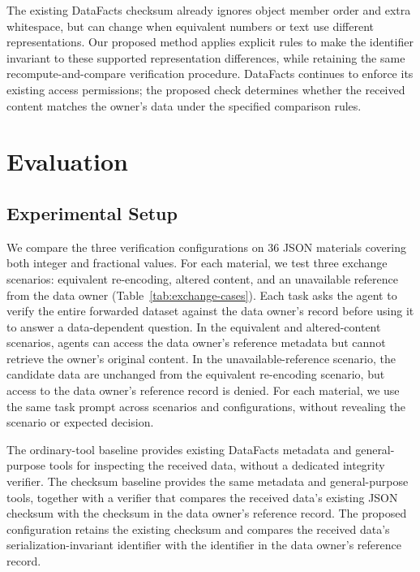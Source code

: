 \documentclass[conference]{IEEEtran}
\begin{document}
The existing DataFacts checksum already ignores object member order and extra whitespace, but can change when equivalent numbers or text use different representations.
Our proposed method applies explicit rules to make the identifier invariant to these supported representation differences, while retaining the same recompute-and-compare verification procedure.
DataFacts continues to enforce its existing access permissions; the proposed check determines whether the received content matches the owner's data under the specified comparison rules.

\section{Evaluation}
\subsection{Experimental Setup}
We compare the three verification configurations on 36 JSON materials covering both integer and fractional values.
For each material, we test three exchange scenarios: equivalent re-encoding, altered content, and an unavailable reference from the data owner (Table~\ref{tab:exchange-cases}).
Each task asks the agent to verify the entire forwarded dataset against the data owner's record before using it to answer a data-dependent question.
In the equivalent and altered-content scenarios, agents can access the data owner's reference metadata but cannot retrieve the owner's original content.
In the unavailable-reference scenario, the candidate data are unchanged from the equivalent re-encoding scenario, but access to the data owner's reference record is denied.
For each material, we use the same task prompt across scenarios and configurations, without revealing the scenario or expected decision.

The ordinary-tool baseline provides existing DataFacts metadata and general-purpose tools for inspecting the received data, without a dedicated integrity verifier.
The checksum baseline provides the same metadata and general-purpose tools, together with a verifier that compares the received data's existing JSON checksum with the checksum in the data owner's reference record.
The proposed configuration retains the existing checksum and compares the received data's serialization-invariant identifier with the identifier in the data owner's reference record.
\end{document}
